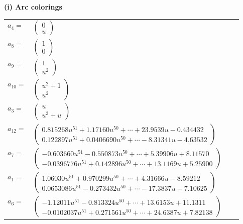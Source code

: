 \documentclass[1p]{elsarticle_modified}
\theoremstyle{definition}
\begin{document}
\flushleft \textbf{(i) Arc colorings}\\
\begin{tabular}{m{7pt} m{180pt} m{7pt} m{180pt} }
\flushright $a_{4}=$&$\begin{pmatrix}0\\u\end{pmatrix}$ \\
\flushright $a_{8}=$&$\begin{pmatrix}1\\0\end{pmatrix}$ \\
\flushright $a_{9}=$&$\begin{pmatrix}1\\u^2\end{pmatrix}$ \\
\flushright $a_{10}=$&$\begin{pmatrix}u^2+1\\u^2\end{pmatrix}$ \\
\flushright $a_{3}=$&$\begin{pmatrix}u\\u^3+u\end{pmatrix}$ \\
\flushright $a_{12}=$&$\begin{pmatrix}0.815268 u^{51}+1.17160 u^{50}+\cdots+23.9539 u-0.434432\\0.122897 u^{51}+0.0406690 u^{50}+\cdots-8.31341 u-4.63532\end{pmatrix}$ \\
\flushright $a_{7}=$&$\begin{pmatrix}-0.603660 u^{51}-0.550873 u^{50}+\cdots+5.39906 u+8.11570\\-0.0396776 u^{51}+0.142896 u^{50}+\cdots+13.1169 u+5.25900\end{pmatrix}$ \\
\flushright $a_{1}=$&$\begin{pmatrix}1.06030 u^{51}+0.970299 u^{50}+\cdots+4.31666 u-8.59212\\0.0653086 u^{51}-0.273432 u^{50}+\cdots-17.3837 u-7.10625\end{pmatrix}$ \\
\flushright $a_{6}=$&$\begin{pmatrix}-1.12011 u^{51}-0.813324 u^{50}+\cdots+13.6153 u+11.1311\\-0.0102037 u^{51}+0.271561 u^{50}+\cdots+24.6387 u+7.82138\end{pmatrix}$ \\

\end{tabular}
\end{document}
